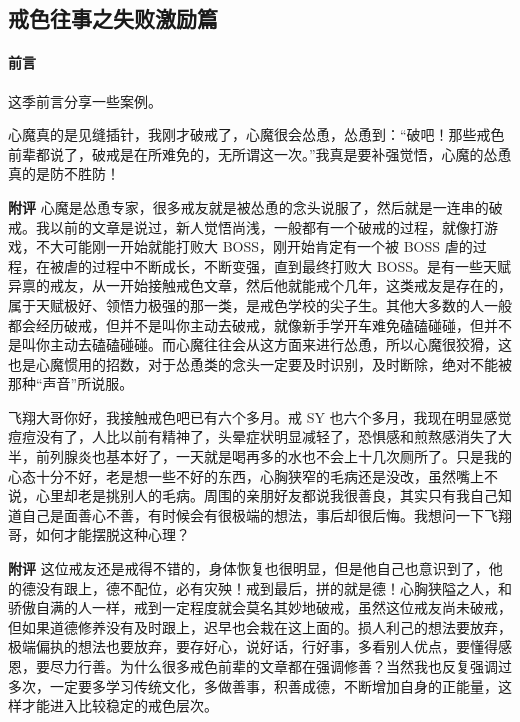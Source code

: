 \subsection{戒色往事之失败激励篇}

\paragraph*{前言}

这季前言分享一些案例。

\begin{case}
    心魔真的是见缝插针，我刚才破戒了，心魔很会怂恿，怂恿到：“破吧！那些戒色前辈都说了，破戒是在所难免的，无所谓这一次。”我真是要补强觉悟，心魔的怂恿真的是防不胜防！

    \textbf{附评} 心魔是怂恿专家，很多戒友就是被怂恿的念头说服了，然后就是一连串的破戒。我以前的文章是说过，新人觉悟尚浅，一般都有一个破戒的过程，就像打游戏，不大可能刚一开始就能打败大 BOSS，刚开始肯定有一个被 BOSS 虐的过程，在被虐的过程中不断成长，不断变强，直到最终打败大 BOSS。是有一些天赋异禀的戒友，从一开始接触戒色文章，然后他就能戒个几年，这类戒友是存在的，属于天赋极好、领悟力极强的那一类，是戒色学校的尖子生。其他大多数的人一般都会经历破戒，但并不是叫你主动去破戒，就像新手学开车难免磕磕碰碰，但并不是叫你主动去磕磕碰碰。而心魔往往会从这方面来进行怂恿，所以心魔很狡猾，这也是心魔惯用的招数，对于怂恿类的念头一定要及时识别，及时断除，绝对不能被那种“声音”所说服。
\end{case}

\begin{case}
    飞翔大哥你好，我接触戒色吧已有六个多月。戒 SY 也六个多月，我现在明显感觉痘痘没有了，人比以前有精神了，头晕症状明显减轻了，恐惧感和煎熬感消失了大半，前列腺炎也基本好了，一天就是喝再多的水也不会上十几次厕所了。只是我的心态十分不好，老是想一些不好的东西，心胸狭窄的毛病还是没改，虽然嘴上不说，心里却老是挑别人的毛病。周围的亲朋好友都说我很善良，其实只有我自己知道自己是面善心不善，有时候会有很极端的想法，事后却很后悔。我想问一下飞翔哥，如何才能摆脱这种心理？

    \textbf{附评} 这位戒友还是戒得不错的，身体恢复也很明显，但是他自己也意识到了，他的德没有跟上，德不配位，必有灾殃！戒到最后，拼的就是德！心胸狭隘之人，和骄傲自满的人一样，戒到一定程度就会莫名其妙地破戒，虽然这位戒友尚未破戒，但如果道德修养没有及时跟上，迟早也会栽在这上面的。损人利己的想法要放弃，极端偏执的想法也要放弃，要存好心，说好话，行好事，多看别人优点，要懂得感恩，要尽力行善。为什么很多戒色前辈的文章都在强调修善？当然我也反复强调过多次，一定要多学习传统文化，多做善事，积善成德，不断增加自身的正能量，这样才能进入比较稳定的戒色层次。
\end{case}

